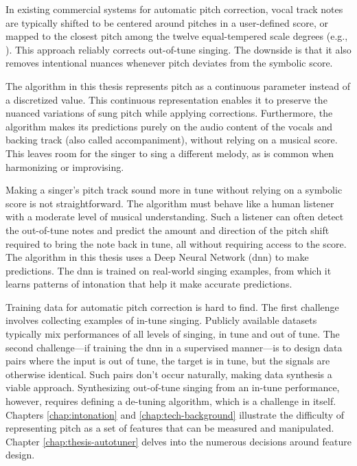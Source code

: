 In existing commercial systems for automatic pitch correction, vocal track notes are typically shifted to be centered around pitches in a user-defined score, or mapped to the closest pitch among the twelve equal-tempered scale degrees (e.g., \cite{antares:2018}). This approach reliably corrects out-of-tune singing. The downside is that it also removes intentional nuances whenever pitch deviates from the symbolic score. 

The algorithm in this thesis represents pitch as a continuous parameter instead of a discretized value. This continuous representation enables it to preserve the nuanced variations of sung pitch while applying corrections. Furthermore, the algorithm makes its predictions purely on the audio content of the vocals and backing track (also called accompaniment), without relying on a musical score. This leaves room for the singer to sing a different melody, as is common when harmonizing or improvising. %

Making a singer's pitch track sound more in tune without relying on a symbolic score is not straightforward. The algorithm must behave like a human listener with a moderate level of musical understanding. Such a listener can often detect the out-of-tune notes and predict the amount and direction of the pitch shift required to bring the note back in tune, all without requiring access to the score. The algorithm in this thesis uses a Deep Neural Network (\gls{dnn}) to make predictions. The \gls{dnn} is trained on real-world singing examples, from which it learns patterns of intonation that help it make accurate predictions.

Training data for automatic pitch correction is hard to find. The first challenge involves collecting examples of in-tune singing. Publicly available datasets typically mix performances of all levels of singing, in tune and out of tune. The second challenge---if training the \gls{dnn} in a supervised manner---is to design data pairs where the input is out of tune, the target is in tune, but the signals are otherwise identical. Such pairs don't occur naturally, making data synthesis a viable approach. Synthesizing out-of-tune singing from an in-tune performance, however, requires defining a de-tuning algorithm, which is a challenge in itself. Chapters \ref{chap:intonation} and \ref{chap:tech-background} illustrate the difficulty of representing pitch as a set of features that can be measured and manipulated. Chapter \ref{chap:thesis-autotuner} delves into the numerous decisions around feature design. 


